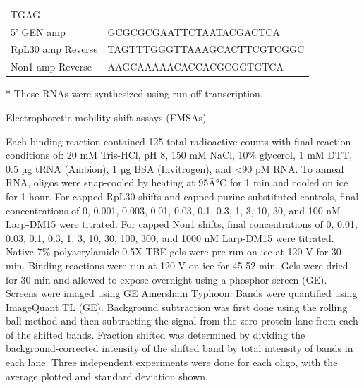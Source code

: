 \documentclass[12pt,twoside]{reedthesis}
\begin{document}
\begin{longtable}[]{@{}ll@{}}
\begin{minipage}[t]{0.46\columnwidth}
TGAG\strut
\end{minipage}\tabularnewline
\begin{minipage}[t]{0.46\columnwidth}\raggedright
5' GEN amp\strut
\end{minipage} & \begin{minipage}[t]{0.46\columnwidth}\raggedright
GCGCGCGAATTCTAATACGACTCA\strut
\end{minipage}\tabularnewline
\begin{minipage}[t]{0.46\columnwidth}\raggedright
RpL30 amp Reverse\strut
\end{minipage} & \begin{minipage}[t]{0.46\columnwidth}\raggedright
TAGTTTGGGTTAAAGCACTTCGTCGGC\strut
\end{minipage}\tabularnewline
\begin{minipage}[t]{0.46\columnwidth}\raggedright
Non1 amp Reverse\strut
\end{minipage} & \begin{minipage}[t]{0.46\columnwidth}\raggedright
AAGCAAAAACACCACGCGGTGTCA\strut
\end{minipage}\tabularnewline
\bottomrule
\end{longtable}
* These RNAs were synthesized using run-off transcription.

{Electrophoretic mobility shift assays (EMSAs)}

Each binding reaction contained 125 total radioactive counts with final
reaction conditions of: 20 mM Tris-HCl, pH 8, 150 mM NaCl, 10\% glycerol,
1 mM DTT, 0.5 µg tRNA (Ambion), 1 µg BSA (Invitrogen), and \textless90 pM RNA.
To anneal RNA, oligos were snap-cooled by heating at 95Â°C for 1 min and
cooled on ice for 1 hour. For capped RpL30 shifts and capped
purine-substituted controls, final concentrations of 0, 0.001, 0.003,
0.01, 0.03, 0.1, 0.3, 1, 3, 10, 30, and 100 nM Larp-DM15 were titrated.
For capped Non1 shifts, final concentrations of 0, 0.01, 0.03, 0.1, 0.3,
1, 3, 10, 30, 100, 300, and 1000 nM Larp-DM15 were titrated. Native 7\%
polyacrylamide 0.5X TBE gels were pre-run on ice at 120 V for 30 min.
Binding reactions were run at 120 V on ice for 45-52 min. Gels were
dried for 30 min and allowed to expose overnight using a phosphor screen
(GE). Screens were imaged using GE Amersham Typhoon. Bands were
quantified using ImageQuant TL (GE). Background subtraction was first
done using the rolling ball method and then subtracting the signal from
the zero-protein lane from each of the shifted bands. Fraction shifted
was determined by dividing the background-corrected intensity of the
shifted band by total intensity of bands in each lane. Three independent
experiments were done for each oligo, with the average plotted and
standard deviation shown.
\end{document}
